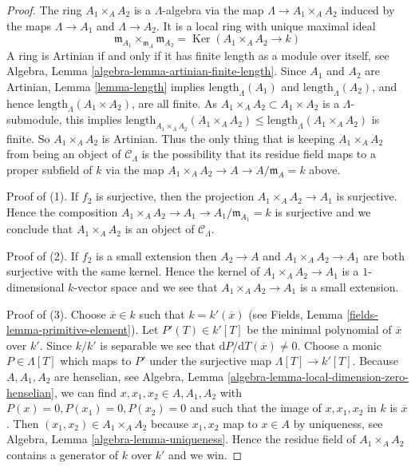 \documentclass{stacks-project}
\theoremstyle{plain}
\theoremstyle{definition}
\theoremstyle{remark}
\numberwithin{equation}{subsection}
\def\Ker{\mathop{\mathrm{Ker}}}
\begin{document}
\begin{proof}
The ring $A_1 \times_A A_2$ is a $\Lambda$-algebra via  the map
$\Lambda \to A_1 \times_A A_2$ induced by the maps
$\Lambda \to A_1$ and $\Lambda \to A_2$. It is a local ring with unique
maximal ideal
$$
\mathfrak m_{A_1} \times_{\mathfrak m_A} \mathfrak m_{A_2} =
\Ker(A_1 \times_A A_2 \longrightarrow k)
$$
A ring is Artinian if and only if it has finite length as a module
over itself, see
Algebra, Lemma \ref{algebra-lemma-artinian-finite-length}.
Since $A_1$ and $A_2$ are Artinian, Lemma \ref{lemma-length} implies
$\text{length}_\Lambda(A_1)$ and $\text{length}_\Lambda(A_2)$,
and hence $\text{length}_\Lambda(A_1 \times A_2)$, are all finite.  As
$A_1 \times_A A_2 \subset A_1 \times A_2$ is a $\Lambda$-submodule, this
implies
$\text{length}_{A_1 \times_A A_2}(A_1 \times_A A_2) \leq
\text{length}_\Lambda(A_1 \times_A A_2)$ is finite. So $A_1
\times_A A_2$ is Artinian. Thus the only thing that is keeping
$A_1 \times_A A_2$ from being an object of $\mathcal{C}_\Lambda$ is
the possibility that its residue field maps to a proper subfield of $k$
via the map $A_1 \times_A A_2 \to A \to A/\mathfrak m_A = k$ above.

\medskip\noindent
Proof of (1). If $f_2$ is surjective, then the projection
$A_1 \times_A A_2 \to A_1$ is surjective. Hence the composition
$A_1 \times_A A_2 \to A_1 \to A_1/\mathfrak m_{A_1} = k$ is surjective
and we conclude that $A_1 \times_A A_2$ is an object of $\mathcal{C}_\Lambda$.

\medskip\noindent
Proof of (2). If $f_2$ is a small extension then $A_2 \to A$ and
$A_1 \times_A A_2  \to A_1$ are both surjective with the same kernel.
Hence the kernel of $A_1 \times_A A_2  \to A_1$ is a $1$-dimensional
$k$-vector space and we see that $A_1 \times_A A_2  \to A_1$ is a small
extension.

\medskip\noindent
Proof of (3). Choose $\overline{x} \in k$ such that
$k = k'(\overline{x})$ (see
Fields, Lemma \ref{fields-lemma-primitive-element}).
Let $P'(T) \in k'[T]$ be the minimal polynomial of $\overline{x}$ over $k'$.
Since $k/k'$ is separable we see that
$\text{d}P/\text{d}T(\overline{x}) \not = 0$.
Choose a monic $P \in \Lambda[T]$ which maps to $P'$ under the surjective map
$\Lambda[T] \to k'[T]$. Because $A, A_1, A_2$ are henselian, see
Algebra, Lemma \ref{algebra-lemma-local-dimension-zero-henselian},
we can find $x, x_1, x_2 \in A, A_1, A_2$ with $P(x) = 0, P(x_1) = 0,
P(x_2) = 0$ and such that the image of $x, x_1, x_2$ in $k$ is $\overline{x}$.
Then $(x_1, x_2) \in A_1 \times_A A_2$ because $x_1, x_2$
map to $x \in A$ by uniqueness, see
Algebra, Lemma \ref{algebra-lemma-uniqueness}.
Hence the residue field of
$A_1 \times_A A_2$ contains a generator of $k$ over $k'$ and we win.
\end{proof}
\end{document}
